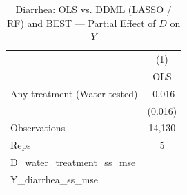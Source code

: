 \begin{table}[htbp]\centering
\def\sym#1{\ifmmode^{#1}\else\(^{#1}\)\fi}
\caption{Diarrhea: OLS vs. DDML (LASSO / RF) and BEST — Partial Effect of $D$ on $Y$}
\begin{tabular}{l*{1}{c}}
\toprule
                &\multicolumn{1}{c}{(1)}\\
                &\multicolumn{1}{c}{OLS}\\
\midrule
Any treatment (Water tested)&   -0.016         \\
                &  (0.016)         \\
\midrule
Observations    &   14,130         \\
Reps            &        5         \\
D\_water\_treatment\_ss\_mse&                  \\
Y\_diarrhea\_ss\_mse&                  \\
\bottomrule
\end{tabular}
\end{table}
